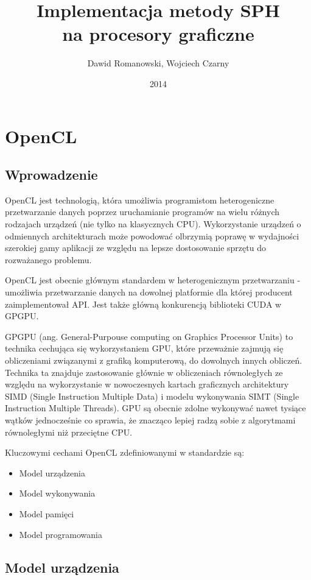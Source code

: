 \documentclass[polish, 12pt]{aghthesis}
\author{Dawid Romanowski, Wojciech Czarny}
\title{Implementacja metody SPH \\ na procesory graficzne}
\date{2014}
\begin{document}
\raggedbottom
\maketitle{}
\tableofcontents
\clearpage

\section{OpenCL}
 
	\subsection{Wprowadzenie}
	
	 OpenCL jest technologią, która umożliwia programistom heterogeniczne przetwarzanie danych poprzez uruchamianie programów na wielu różnych rodzajach urządzeń (nie tylko na klasycznych CPU). Wykorzystanie urządzeń o odmiennych architekturach może powodować olbrzymią poprawę w wydajności szerokiej gamy aplikacji ze względu na lepsze dostosowanie sprzętu do rozważanego problemu.
	 	 
	 OpenCL jest obecnie głównym standardem w heterogenicznym przetwarzaniu - umożliwia przetwarzanie danych na dowolnej platformie dla której producent zaimplementował API. Jest także główną konkurencją biblioteki CUDA w GPGPU.
	 
	 GPGPU (ang. General-Purpouse computing on Graphics Processor Units) to technika cechująca się wykorzystaniem GPU, które przeważnie zajmują się obliczeniami związanymi z grafiką komputerową, do dowolnych innych obliczeń. Technika ta znajduje zastosowanie głównie w obliczeniach równoległych ze względu na wykorzystanie w nowoczesnych kartach graficznych architektury SIMD (Single Instruction Multiple Data) i modelu wykonywania SIMT (Single Instruction Multiple Threads). GPU są obecnie zdolne wykonywać nawet tysiące wątków jednocześnie co sprawia, że znacząco lepiej radzą sobie z algorytmami równoległymi niż przeciętne CPU. 
	
	Kluczowymi cechami OpenCL zdefiniowanymi w standardzie są:
	\begin{itemize}
	\item Model urządzenia
	\item Model wykonywania
	\item Model pamięci
	\item Model programowania
	\end{itemize}
	
	\subsection{Model urządzenia}
	
\end{document}
